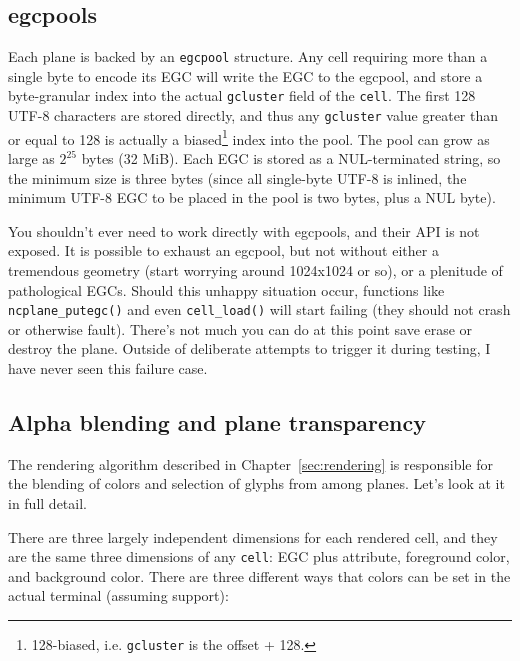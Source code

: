 \subsection{egcpools}
\label{sec:egcpools}
Each plane is backed by an \texttt{egcpool} structure. Any cell requiring more
than a single byte to encode its EGC will write the EGC to the egcpool, and
store a byte-granular index into the actual \texttt{gcluster} field of the
\texttt{cell}. The first 128 UTF-8 characters are stored directly, and thus
any \texttt{gcluster} value greater than or equal to 128 is actually a
biased\footnote{128-biased, i.e. \texttt{gcluster} is the offset + 128.}
index into the pool. The pool can grow as large as $2^{25}$ bytes (32 MiB).
Each EGC is stored as a NUL-terminated string, so the minimum size is three
bytes (since all single-byte UTF-8 is inlined, the minimum UTF-8 EGC to be
placed in the pool is two bytes, plus a NUL byte).

You shouldn't ever need to work directly with egcpools, and their API is not
exposed. It is possible to exhaust an egcpool, but not without either a tremendous
geometry (start worrying around 1024x1024 or so), or a plenitude of pathological
EGCs. Should this unhappy situation occur, functions like \texttt{ncplane\_putegc()}
and even \texttt{cell\_load()} will start failing (they should not crash or otherwise
fault). There's not much you can do at this point save erase or destroy the plane.
Outside of deliberate attempts to trigger it during testing, I have never seen
this failure case.

\subsection{Alpha blending and plane transparency}
\label{sec:alpha}
The rendering algorithm described in Chapter~\ref{sec:rendering} is responsible
for the blending of colors and selection of glyphs from among planes. Let's look
at it in full detail.

There are three largely independent dimensions for each rendered cell, and they
are the same three dimensions of any \texttt{cell}: EGC plus attribute, foreground
color, and background color. There are three different ways that colors can be
set in the actual terminal (assuming support):

